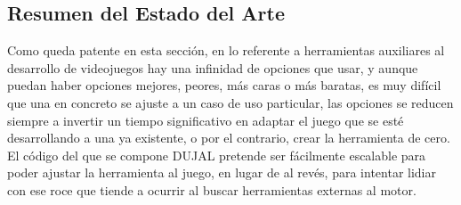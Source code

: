 \subsection{Resumen del Estado del Arte}
Como queda patente en esta sección, en lo referente a herramientas auxiliares al desarrollo de videojuegos hay una infinidad de opciones que usar, y aunque puedan haber opciones mejores, peores, más caras o más baratas,
es muy difícil que una en concreto se ajuste a un caso de uso particular, las opciones se reducen siempre a invertir un tiempo significativo en adaptar el juego que se esté desarrollando a una ya existente, o por el contrario, 
crear la herramienta de cero. El código del que se compone DUJAL pretende ser fácilmente escalable para poder ajustar la herramienta al juego, en lugar de al revés, para intentar lidiar con ese roce que tiende a ocurrir al 
buscar herramientas externas al motor.